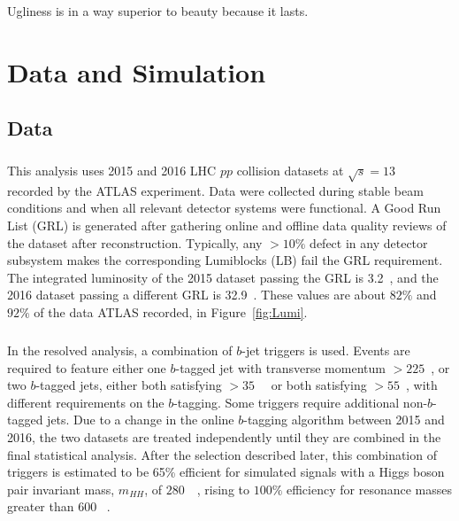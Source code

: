 \begin{savequote}[75mm]
Ugliness is in a way superior to beauty because it lasts.
\end{savequote}
\chapter{Data and Simulation}
%

\section{Data}

\paragraph{}
This analysis uses 2015 and 2016 LHC $pp$ collision datasets at $\sqrt{s} = 13$~\TeV~ recorded by the ATLAS experiment. Data were collected during stable beam conditions and when all relevant detector systems were functional. A Good Run List (GRL) is generated after gathering online and offline data quality reviews of the dataset after reconstruction. Typically, any $> 10\%$ defect in any detector subsystem makes the corresponding Lumiblocks (LB) fail the GRL requirement. The integrated luminosity of the 2015 dataset passing the GRL is 3.2~\ifb, and the 2016 dataset passing a different GRL is 32.9~\ifb. These values are about $82\%$ and $92\%$ of the data ATLAS recorded, in Figure~\ref{fig:Lumi}.

\paragraph{}
In the resolved analysis, a combination of $b$-jet triggers is used. Events are required to feature either one $b$-tagged jet with transverse momentum \pt$>225$~\GeV, or two $b$-tagged jets, either both satisfying \pt$>35$~\GeV~ or both satisfying \pt$>55$~\GeV, with different requirements on the $b$-tagging. Some triggers require additional non-$b$-tagged jets. Due to a change in the online $b$-tagging algorithm between 2015 and 2016, the two datasets are treated independently until they are combined in the final statistical analysis. After the selection described later, this combination of triggers is estimated to be 65\% efficient for simulated signals with a Higgs boson pair invariant mass, $m_{HH}$, of $280$~\GeV~, rising to $100\%$ efficiency for resonance masses greater than $600$ \GeV~. 


